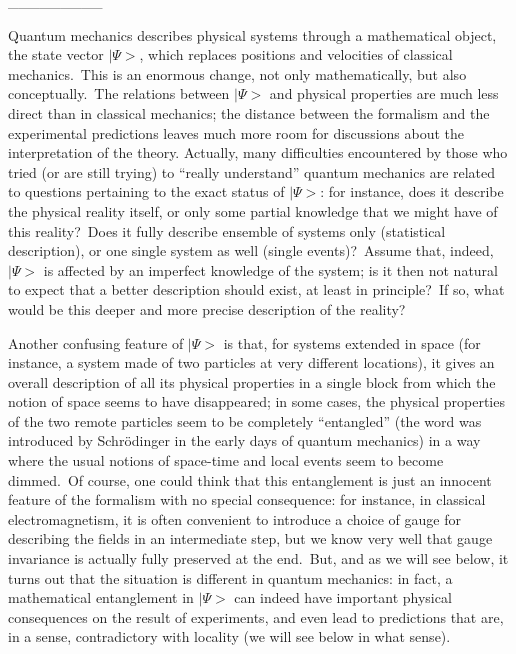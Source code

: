 \documentclass[12pt,onecolumn]{article}%
\begin{document}
\bigskip

\begin{center}
\_\_\_\_\_\_\_\_\_
\end{center}

\bigskip

Quantum mechanics describes physical systems through a mathematical object,
the state vector $\mid\Psi>$, which replaces positions and velocities of
classical mechanics.\ This is an enormous change, not only mathematically, but
also conceptually.\ The relations between $\mid\Psi>$ and physical properties
are much less direct than in classical mechanics; the distance between the
formalism and the experimental predictions leaves much more room for
discussions about the interpretation of the theory. Actually, many
difficulties encountered by those who tried (or are still trying) to ``really
understand'' quantum mechanics are related to questions pertaining to the
exact status of $\mid\Psi>$: for instance, does it describe the physical
reality itself, or only some partial knowledge that we might have of this
reality?\ Does it fully describe ensemble of systems only (statistical
description), or one single system as well (single events)?\ Assume that,
indeed, $\mid\Psi>$ is affected by an imperfect knowledge of the system; is it
then not natural to expect that a better description should exist, at least in
principle?\ If so, what would be this deeper and more precise description of
the reality?

Another confusing feature of $\mid\Psi>$ is that, for systems extended in
space (for instance, a system made of two particles at very different
locations), it gives an overall description of all its physical properties in
a single block from which the notion of space seems to have disappeared; in
some cases, the physical properties of the two remote particles seem to be
completely ``entangled'' (the word was introduced by Schr\"{o}dinger in the
early days of quantum mechanics) in a way where the usual notions of
space-time and local events seem to become dimmed.\ Of course, one could think
that this entanglement is just an innocent feature of the formalism with no
special consequence: for instance, in classical electromagnetism, it is often
convenient to introduce a choice of gauge for describing the fields in an
intermediate step, but we know very well that gauge invariance is actually
fully preserved at the end.\ But, and as we will see below, it turns out that
the situation is different in quantum mechanics: in fact, a mathematical
entanglement in $\mid\Psi>$ can indeed have important physical consequences on
the result of experiments, and even lead to predictions that are, in a sense,
contradictory with locality (we will see below in what sense).
\end{document}
